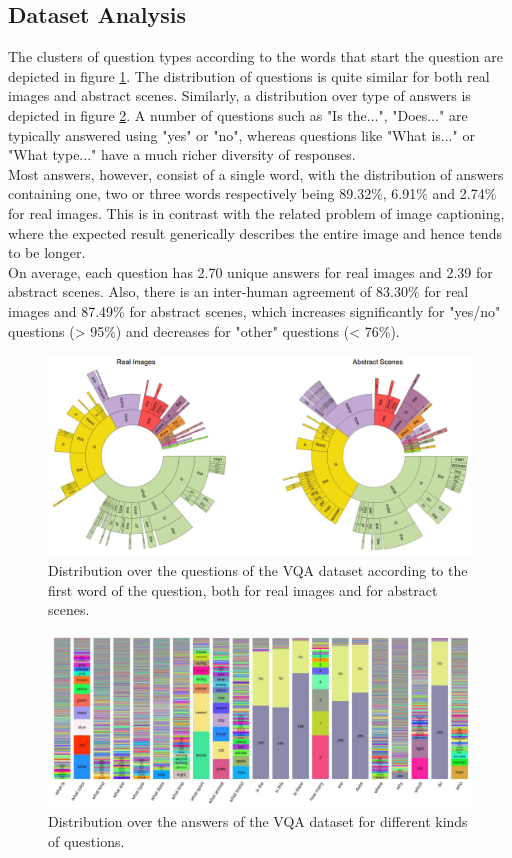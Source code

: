 \documentclass{article}
\begin{document}
\subsection{Dataset Analysis}
The clusters of question types according to the words that start the question are depicted in figure \ref{qdist}. The distribution of questions is quite similar for both real images and abstract scenes. Similarly, a distribution over type of answers is depicted in figure \ref{ansdist}. A number of questions such as "Is the...", "Does..." are typically answered using "yes" or "no", whereas questions like "What is..." or "What type..." have a much richer diversity of responses.\\
Most answers, however, consist of a single word, with the distribution of answers containing one, two or three words respectively being 89.32\%, 6.91\% and 2.74\% for real images. This is in contrast with the related problem of image captioning, where the expected result generically describes the entire image and hence tends to be longer.\\
On average, each question has 2.70 unique answers for real images and 2.39 for abstract scenes. Also, there is an inter-human agreement  of 83.30\% for real images and 87.49\% for abstract scenes, which increases significantly for "yes/no" questions (> 95\%) and decreases for "other" questions (< 76\%).

    \begin{figure}[ht]
    	\centering
            \includegraphics[width=1.0\linewidth]{qdist.PNG}
    	\caption{Distribution over the questions of the VQA dataset according to the first word of the question, both for real images and for abstract scenes.}
    	\label{qdist}
    \end{figure}
    \begin{figure}[ht]
    	\centering
            \includegraphics[width=1.0\linewidth]{ansdist.PNG}
    	\caption{Distribution over the answers of the VQA dataset for different kinds of questions.}
    	\label{ansdist}
    \end{figure}
\end{document}
